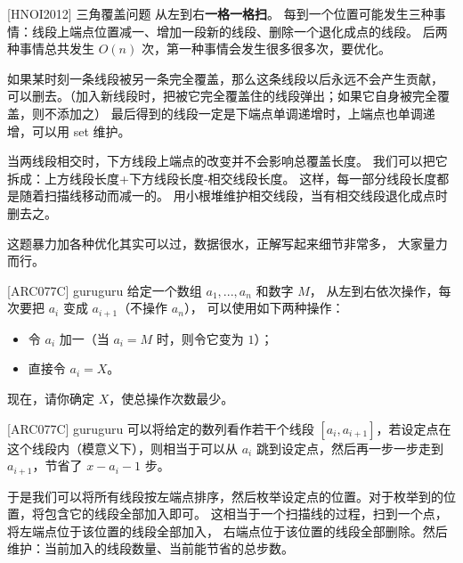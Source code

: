 \documentclass{beamer}
\begin{document}
\begin{frame}{[HNOI2012] 三角覆盖问题}
    \footnotesize
    从左到右\textbf{一格一格扫}。
    每到一个位置可能发生三种事情：线段上端点位置减一、增加一段新的线段、删除一个退化成点的线段。
    后两种事情总共发生 $O(n)$ 次，第一种事情会发生很多很多次，要优化。

    \vspace{1em}\pause
    如果某时刻一条线段被另一条完全覆盖，那么这条线段以后永远不会产生贡献，
    可以删去。（加入新线段时，把被它完全覆盖住的线段弹出；如果它自身被完全覆盖，则不添加之）
    最后得到的线段一定是下端点单调递增时，上端点也单调递增，可以用 set 维护。

    \vspace{1em}\pause
    当两线段相交时，下方线段上端点的改变并不会影响总覆盖长度。
    我们可以把它拆成：上方线段长度+下方线段长度-相交线段长度。
    这样，每一部分线段长度都是随着扫描线移动而减一的。
    用小根堆维护相交线段，当有相交线段退化成点时删去之。

    \vspace{1em}\pause
    这题暴力加各种优化其实可以过，数据很水，正解写起来细节非常多，
    大家量力而行。
\end{frame}

\begin{frame}{[ARC077C] guruguru}
    \footnotesize
    给定一个数组 $a_1,...,a_n$ 和数字 $M$，
    从左到右依次操作，每次要把 $a_i$ 变成 $a_{i+1}$（不操作 $a_n$），
    可以使用如下两种操作：

    \begin{itemize}
        \item 令 $a_i$ 加一（当 $a_i=M$ 时，则令它变为 $1$）；
        \item 直接令 $a_i=X$。
    \end{itemize}

    现在，请你确定 $X$，使总操作次数最少。
\end{frame}

\begin{frame}{[ARC077C] guruguru}
    \footnotesize
    可以将给定的数列看作若干个线段 $[a_i,a_{i+1}]$，若设定点在这个线段内（模意义下），则相当于可以从
    $a_i$ 跳到设定点，然后再一步一步走到 $a_{i+1}$，节省了 $x-a_i-1$ 步。
 
    \vspace{1em}\pause
    于是我们可以将所有线段按左端点排序，然后枚举设定点的位置。对于枚举到的位置，将包含它的线段全部加入即可。
    这相当于一个扫描线的过程，扫到一个点，将左端点位于该位置的线段全部加入，
    右端点位于该位置的线段全部删除。然后维护：当前加入的线段数量、当前能节省的总步数。
\end{frame}
\end{document}
